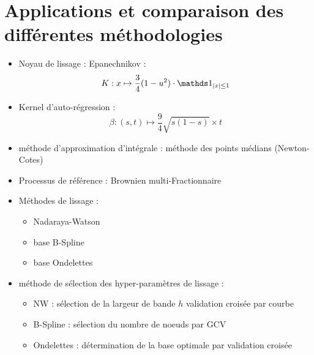 \chapter{Applications et comparaison des différentes méthodologies}
\minitoc%


\begin{itemize}
    \item Noyau de lissage : Epanechnikov :
    $$K : x \mapsto \frac 3 4 (1 - u^2)\cdot \indicatrice{|x| \leq 1}$$
    \item Kernel d'auto-régression : 
    $$\beta : (s,t) \mapsto \frac 9 4 \sqrt{s(1-s)} \times t$$
    \item méthode d'approximation d'intégrale : méthode des points médians (Newton-Cotes)
    \item Processus de référence : Brownien multi-Fractionnaire
    \citationrequise
    \item Méthodes de lissage : 
    \begin{itemize}
        \item Nadaraya-Watson
        \item base B-Spline
        \item base Ondelettes
    \end{itemize}
    \item méthode de sélection des hyper-paramètres de lissage :
    \begin{itemize}
        \item NW : sélection de la largeur de bande $h$ validation croisée par courbe
        \item B-Spline : sélection du nombre de noeuds par GCV
        \item Ondelettes : détermination de la base optimale par validation croisée
    \end{itemize}
\end{itemize}

